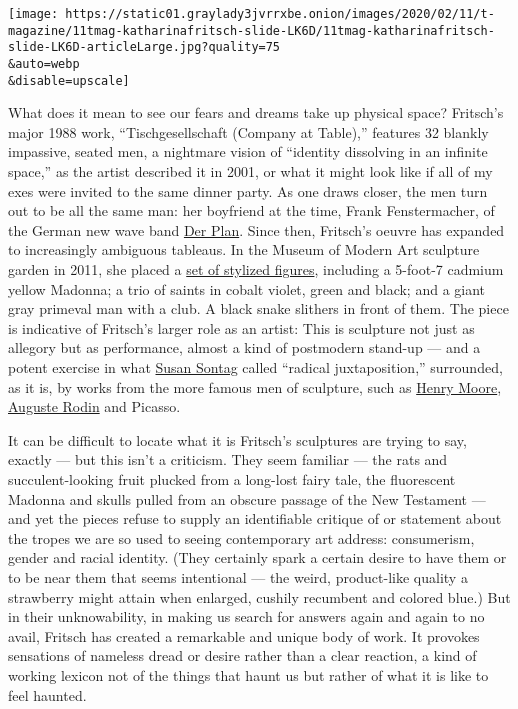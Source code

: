 \texttt{[image: https://static01.graylady3jvrrxbe.onion/images/2020/02/11/t-magazine/11tmag-katharinafritsch-slide-LK6D/11tmag-katharinafritsch-slide-LK6D-articleLarge.jpg?quality=75\\\&auto=webp\\\&disable=upscale]}

What does it mean to see our fears and dreams take up physical space?
Fritsch's major 1988 work, ``Tischgesellschaft (Company at Table),''
features 32 blankly impassive, seated men, a nightmare vision of
``identity dissolving in an infinite space,'' as the artist described it
in 2001, or what it might look like if all of my exes were invited to
the same dinner party. As one draws closer, the men turn out to be all
the same man: her boyfriend at the time, Frank Fenstermacher, of the
German new wave band \href{http://www.bureau-b.com/plan.php}{Der Plan}.
Since then, Fritsch's oeuvre has expanded to increasingly ambiguous
tableaus. In the Museum of Modern Art sculpture garden in 2011, she
placed a
\href{https://www.moma.org/explore/inside_out/2011/06/16/katharina-fritsch-in-moma-s-garden/}{set
of stylized figures}, including a 5-foot-7 cadmium yellow Madonna; a
trio of saints in cobalt violet, green and black; and a giant gray
primeval man with a club. A black snake slithers in front of them. The
piece is indicative of Fritsch's larger role as an artist: This is
sculpture not just as allegory but as performance, almost a kind of
postmodern stand-up --- and a potent exercise in what
\href{https://www.nytimes3xbfgragh.onion/topic/person/susan-sontag}{Susan
Sontag} called ``radical juxtaposition,'' surrounded, as it is, by works
from the more famous men of sculpture, such as
\href{https://www.nytimes3xbfgragh.onion/2012/06/26/arts/26iht-moore26.html}{Henry
Moore},
\href{https://www.nytimes3xbfgragh.onion/topic/person/auguste-rodin}{Auguste
Rodin} and Picasso.

It can be difficult to locate what it is Fritsch's sculptures are trying
to say, exactly --- but this isn't a criticism. They seem familiar ---
the rats and succulent-looking fruit plucked from a long-lost fairy
tale, the fluorescent Madonna and skulls pulled from an obscure passage
of the New Testament --- and yet the pieces refuse to supply an
identifiable critique of or statement about the tropes we are so used to
seeing contemporary art address: consumerism, gender and racial
identity. (They certainly spark a certain desire to have them or to be
near them that seems intentional --- the weird, product-like quality a
strawberry might attain when enlarged, cushily recumbent and colored
blue.) But in their unknowability, in making us search for answers again
and again to no avail, Fritsch has created a remarkable and unique body
of work. It provokes sensations of nameless dread or desire rather than
a clear reaction, a kind of working lexicon not of the things that haunt
us but rather of what it is like to feel haunted.

